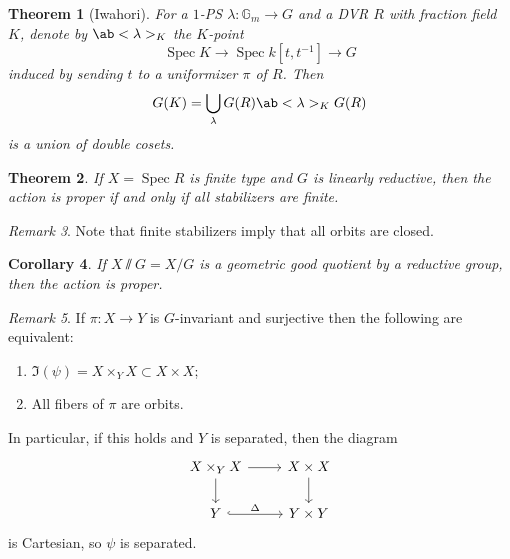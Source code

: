 \documentclass{amsart}
\newtheorem{thm}{Theorem}[section]
\newtheorem{cor}[thm]{Corollary}
\theoremstyle{definition}
\theoremstyle{remark}
\newtheorem{rmk}[thm]{Remark}
\theoremstyle{plain}
\theoremstyle{definition}
\theoremstyle{remark}
\newcommand{\G}{\mathbb{G}}
\newcommand{\1}{\mathbf{1}}
\newcommand{\2}{\mathbf{2}}
\newcommand{\3}{\mathbf{3}}
\DeclareMathOperator{\Spec}{Spec}
\begin{document}
\begin{thm}[Iwahori]
    For a \(1\)-PS \(\lambda \colon \G_m \to G\) and a DVR \(R\) with fraction field \(K\), denote by \(\ab<\lambda>_K\) the \(K\)-point
    \[ \Spec K \to \Spec k[t,t^{-1}] \to G \]
    induced by sending \(t\) to a uniformizer \(\pi\) of \(R\). Then
    \[ G(K) = \bigcup_{\lambda} G(R) \ab<\lambda>_K G(R) \]
    is a union of double cosets.
\end{thm}

\begin{thm}\label{thm:proper-stabilizers}
    If \(X = \Spec R\) is finite type and \(G\) is linearly reductive, then the action is proper if and only if all stabilizers are finite.
\end{thm}

\begin{rmk}
    Note that finite stabilizers imply that all orbits are closed.
\end{rmk}

\begin{cor}
    If \(X \sslash G = X/G\) is a geometric good quotient by a reductive group, then the action is proper.
\end{cor}

\begin{rmk}
    If \(\pi \colon X \to Y\) is \(G\)-invariant and surjective then the following are equivalent:
    \begin{enumerate}
        \item \(\Im (\psi) = X \times_Y X \subset X \times X\);
        \item All fibers of \(\pi\) are orbits.
    \end{enumerate}
    In particular, if this holds and \(Y\) is separated, then the diagram
    \begin{equation*}
    \begin{tikzcd}
        X \times_Y X \ar{r} \ar{d} & X \times X \ar{d} \\
        Y \ar[hookrightarrow]{r}{\Delta} & Y \times Y
    \end{tikzcd}
    \end{equation*}
    is Cartesian, so \(\psi\) is separated.
\end{rmk}
\end{document}
